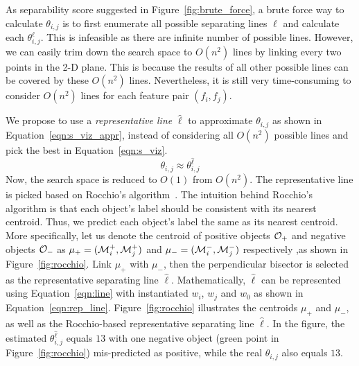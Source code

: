  As separability score suggested in Figure~\ref{fig:brute_force}, a brute force way to calculate $\theta_{i,j}$ is to first enumerate all possible separating lines $\ell$ and calculate each $\theta_{i,j}^\ell$. This is infeasible as there are infinite number of possible lines. However, we can easily trim down the search space to $O(n^2)$ lines by linking every two points in the 2-D plane. This is because the results of all other possible lines can be covered by these $O(n^2)$ lines. Nevertheless, it is still very time-consuming to consider $O(n^2)$ lines for each feature pair $(f_i,f_j)$. 

 We propose to use a {\em representative line} $\hat{\ell}$ to approximate $\theta_{i, j}$ as shown in Equation~\ref{eqn:s_viz_appr}, instead of considering all $O(n^2)$ possible lines and pick the best in Equation~\ref{eqn:s_viz}. 
\begin{equation}\label{eqn:s_viz_appr}
\theta_{i,j}  \approx \theta_{i,j}^{\hat{\ell}}
\end{equation}
Now, the search space is reduced to $O(1)$ from $O(n^2)$. The representative line is picked based on Rocchio's algorithm~\cite{rocchio1971relevance}. 
The intuition behind Rocchio's algorithm is that each object's label should be consistent with its nearest centroid. Thus, we predict each object's label the same as its nearest centroid. More specifically, let us denote the centroid of positive objects $\oo_+$ and negative objects $\oo_-$ as $\mu_+=(\mm_i^+,\mm_j^+)$ and $\mu_-=(\mm_i^-,\mm_j^-)$ respectively ,as shown in Figure~\ref{fig:rocchio}. Link $\mu_+$ with $\mu_-$, then the perpendicular bisector is selected as the representative separating line $\hat{\ell}$. Mathematically, $\hat{\ell}$ can be represented using Equation~\ref{eqn:line} with instantiated $w_i$, $w_j$ and $w_0$ as shown in Equation~\ref{eqn:rep_line}. Figure~\ref{fig:rocchio} illustrates the centroids $\mu_+$ and $\mu_-$, as well as the Rocchio-based representative separating line $\hat{\ell}$. In the figure, the estimated $\theta_{i,j}^{\hat{\ell}}$ equals $13$ with one negative object (green point in Figure~\ref{fig:rocchio}) mis-predicted as positive, while the real $\theta_{i,j}$ also equals $13$.





